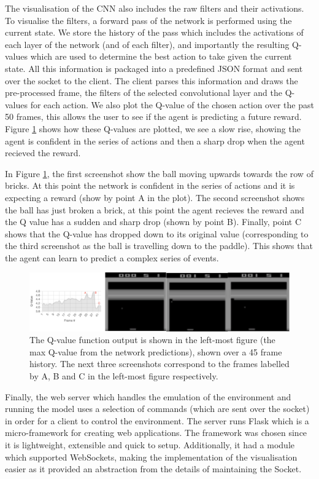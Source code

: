The visualisation of the CNN also includes the raw filters and their activations. To visualise the filters, a forward pass of the network is performed using the current state. We store the history of the pass which includes the activations of each layer of the network (and of each filter), and importantly the resulting Q-values which are used to determine the best action to take given the current state. All this information is packaged into a predefined JSON format and sent over the socket to the client. The client parses this information and draws the pre-processed frame, the filters of the selected convolutional layer and the Q-values for each action. We also plot the Q-value of the chosen action over the past 50 frames, this allows the user to see if the agent is predicting a future reward. Figure \ref{fig:q-value-plot} shows how these Q-values are plotted, we see a slow rise, showing the agent is confident in the series of actions and then a sharp drop when the agent recieved the reward.

In Figure \ref{fig:q-value-plot}, the first screenshot show the ball moving upwards towards the row of bricks. At this point the network is confident in the series of actions and it is expecting a reward (show by point A in the plot). The second screenshot shows the ball has just broken a brick, at this point the agent recieves the reward and the Q value has a sudden and sharp drop (shown by point B). Finally, point C shows that the Q-value has dropped down to its original value (corresponding to the third screenshot as the ball is travelling down to the paddle). This shows that the agent can learn to predict a complex series of events.


\begin{figure}[htbp]
	\centering
	\includegraphics[width=1\textwidth]{chapters/chapter4/images/qvalue-plot.png}
	\caption[Q-Value function visualisation]{The Q-value function output is shown in the left-most figure (the max Q-value from the network predictions), shown over a 45 frame history. The next three screenshots correspond to the frames labelled by A, B and C in the left-most figure respectively.
		\label{fig:q-value-plot}
	}
\end{figure}

Finally, the web server which handles the emulation of the environment and running the model uses a selection of commands (which are sent over the socket) in order for a client to control the environment. The server runs Flask which is a micro-framework for creating web applications. The framework was chosen since it is lightweight, extensible and quick to setup. Additionally, it had a module which supported WebSockets, making the implementation of the visualisation easier as it provided an abstraction from the details of maintaining the Socket.